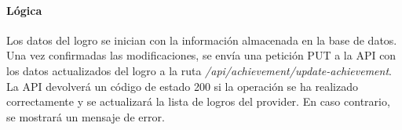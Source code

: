 \paragraph*{Lógica}
Los datos del logro se inician con la información almacenada en la base de datos. Una vez confirmadas las modificaciones, 
se envía una petición PUT a la API con los datos actualizados del logro a la ruta \textit{/api/achievement/update-achievement}. 
La API devolverá un código de estado 200 si la operación se ha realizado correctamente y se actualizará la lista de logros del provider. 
En caso contrario, se mostrará un mensaje de error.

